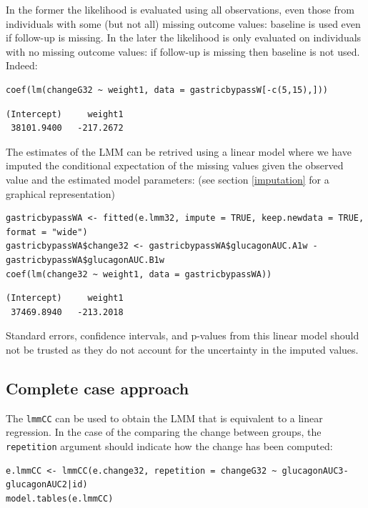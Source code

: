 \documentclass[12pt]{article}
\newcommand\Warning[1][3ex]{%
\renewcommand\stacktype{L}%
\scaleto{\stackon[1.3pt]{\color{red}$\triangle$}{\tiny\bfseries !}}{#1}%
\xspace
}
\begin{document}
In the former the likelihood is evaluated using all observations, even
those from individuals with some (but not all) missing outcome values:
baseline is used even if follow-up is missing. In the later the
likelihood is only evaluated on individuals with no missing outcome
values: if follow-up is missing then baseline is not used. Indeed:
\lstset{language=r,label= ,caption= ,captionpos=b,numbers=none}
\begin{lstlisting}
coef(lm(changeG32 ~ weight1, data = gastricbypassW[-c(5,15),]))

\end{lstlisting}

\begin{verbatim}
(Intercept)     weight1 
 38101.9400   -217.2672
\end{verbatim}


The estimates of the LMM can be retrived using a linear model where we
have imputed the conditional expectation of the missing values given
the observed value and the estimated model parameters: (see section
\ref{imputation} for a graphical representation)
\lstset{language=r,label= ,caption= ,captionpos=b,numbers=none}
\begin{lstlisting}
gastricbypassWA <- fitted(e.lmm32, impute = TRUE, keep.newdata = TRUE, format = "wide")
gastricbypassWA$change32 <- gastricbypassWA$glucagonAUC.A1w - gastricbypassWA$glucagonAUC.B1w
coef(lm(change32 ~ weight1, data = gastricbypassWA))
\end{lstlisting}

\begin{verbatim}
(Intercept)     weight1 
 37469.8940   -213.2018
\end{verbatim}



\Warning Standard errors, confidence intervals, and p-values from this
linear model should not be trusted as they do not account for the
uncertainty in the imputed values.

\subsection{Complete case approach}
\label{sec:org1018362}

The \texttt{lmmCC} can be used to obtain the LMM that is equivalent to a
linear regression. In the case of the comparing the change between
groups, the \texttt{repetition} argument should indicate how the change has
been computed:
\lstset{language=r,label= ,caption= ,captionpos=b,numbers=none}
\begin{lstlisting}
e.lmmCC <- lmmCC(e.change32, repetition = changeG32 ~ glucagonAUC3-glucagonAUC2|id)
model.tables(e.lmmCC)
\end{lstlisting}
\end{document}
